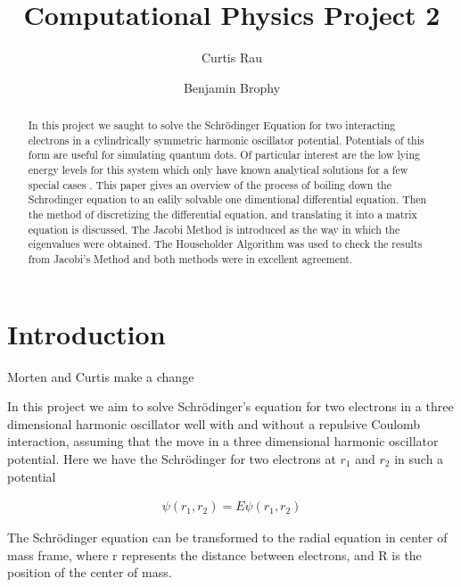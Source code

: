 \documentclass[twocolumn, groupedaddress]{revtex4-1}
\begin{document}
\author{Curtis Rau}
\author{Benjamin Brophy}
\title{Computational Physics Project 2}

\begin{abstract}
In this project we saught to solve the Schr\"{o}dinger Equation for two interacting electrons in a cylindrically symmetric harmonic oscillator potential.  Potentials of this form are useful for simulating quantum dots.  Of particular interest are the low lying energy levels for this system which only have known analytical solutions for a few special cases \cite{taut}.  This paper gives an overview of the process of boiling down the Schrodinger equation to an ealily solvable one dimentional differential equation.  Then the method of discretizing the differential equation, and translating it into a matrix equation is discussed.  The Jacobi Method is introduced as the way in which the eigenvalues were obtained.  The Householder Algorithm was used to check the results from Jacobi's Method and both methods were in excellent agreement.
\end{abstract}

\maketitle


\section{Introduction}

Morten and Curtis make a change

In this project we aim to solve Schr\"{o}dinger's equation for two electrons in a three dimensional harmonic oscillator well with and without a repulsive Coulomb interaction, assuming that the move in a three dimensional harmonic oscillator potential. Here we have the Schr\"odinger for two electrons at $r_1$ and $r_2$ in such a potential

\begin{align}
[- \frac{\hbar^2}{2m} \left( \nabla_1^2 + \nabla_2^2 \right)				\nonumber
		+ \frac{1}{2}m\omega^2 \left( r_1^2 + r_2^2 \right)				\\
		+ \frac{ke^2}{|r_1^2-r_2^2|}
		]
		\psi (r_1,r_2)  = E \psi (r_1,r_2)
\end{align}


The Schr\"{o}dinger equation can be transformed to the radial equation in center of mass frame, where r represents the distance between electrons, and R is the position of the center of mass.
\end{document}
